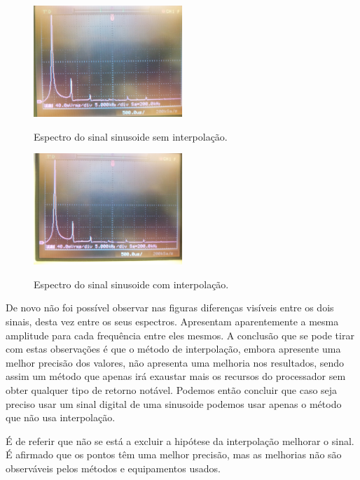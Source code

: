 \documentclass[11pt]{article}
\numberwithin{equation}{section}
\begin{document}
\begin{figure}[H]
	\centering
	\includegraphics[width=0.5\textwidth]{./P1-8_espect_s_interp}~\\
	\caption{Espectro do sinal sinusoide sem interpolação.}
	\label{fig:espect_s_interp}
\end{figure}

\begin{figure}[H]
	\centering
	\includegraphics[width=0.5\textwidth]{./P1-8_espect_c_interp}~\\
	\caption{Espectro do sinal sinusoide com interpolação.}
	\label{fig:espect_c_interp}
\end{figure}

De novo não foi possível observar nas figuras diferenças visíveis entre os dois sinais, desta vez entre os seus espectros. Apresentam aparentemente a mesma amplitude para cada frequência entre eles mesmos.
A conclusão que se pode tirar com estas observações é que o método de interpolação, embora apresente uma melhor precisão dos valores, não apresenta uma melhoria nos resultados, sendo assim um método que apenas irá exaustar mais os recursos do processador sem obter qualquer tipo de retorno notável. Podemos então concluir que caso seja preciso usar um sinal digital de uma sinusoide podemos usar apenas o método que não usa interpolação.


É de referir que não se está a excluir a hipótese da interpolação melhorar o sinal. É afirmado que os pontos têm uma melhor precisão, mas as melhorias não são observáveis pelos métodos e equipamentos usados.
\end{document}
